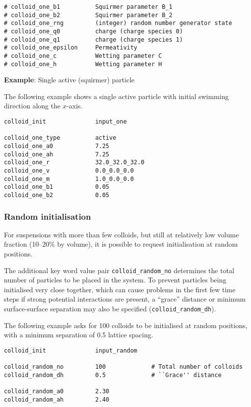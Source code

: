 \begin{lstlisting}
# colloid_one_b1          Squirmer parameter B_1
# colloid_one_b2          Squirmer parameter B_2
# colloid_one_rng         (integer) random number generator state
# colloid_one_q0          charge (charge species 0)
# colloid_one_q1          charge (charge species 1)
# colloid_one_epsilon     Permeativity
# colloid_one_c           Wetting parameter C
# colloid_one_h           Wetting parameter H
\end{lstlisting}

{\bf Example}: Single active (squirmer) particle

The following example shows a single active particle with initial
swimming direction along the $x$-axis.
\begin{lstlisting}
colloid_init              input_one

colloid_one_type          active
colloid_one_a0            7.25
colloid_one_ah            7.25
colloid_one_r             32.0_32.0_32.0
colloid_one_v             0.0_0.0_0.0
colloid_one_m             1.0_0.0_0.0
colloid_one_b1            0.05
colloid_one_b2            0.05
\end{lstlisting}



\subsubsection{Random initialisation}

For suspensions with more than few colloids, but still at
relatively low volume fraction (10--20\% by volume), it is
possible to request initialisation at random positions.

The additional key word value pair \texttt{colloid\_random\_no}
determines the total number of particles to be placed in
the system. To prevent particles being initialised very
close together, which can cause problems in the first few
time steps if strong potential interactions are present,
a ``grace'' distance or minimum surface-surface separation
may also be specified (\texttt{colloid\_random\_dh}).

The following example asks for 100 colloids to be initialised
at random positions, with a minimum separation of 0.5 lattice
spacing.

\begin{lstlisting}
colloid_init              input_random

colloid_random_no         100             # Total number of colloids
colloid_random_dh         0.5             # ``Grace'' distance

colloid_random_a0         2.30
colloid_random_ah         2.40
\end{lstlisting}


